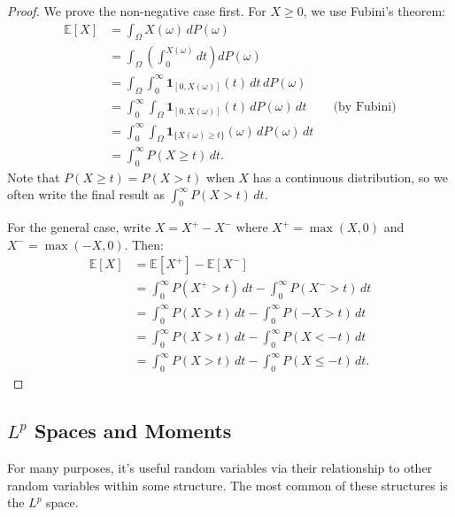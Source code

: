 \documentclass[11pt,reqno]{amsart}
\theoremstyle{definition}
\theoremstyle{remark}
\begin{document}
\begin{proof}
	We prove the non-negative case first. For $X \geq 0$, we use Fubini's theorem:
	\begin{align*}
		\mathbb{E}[X] & = \int_\Omega X(\omega) \, dP(\omega)                                                                             \\
		              & = \int_\Omega \left( \int_0^{X(\omega)} dt \right) dP(\omega)                                                     \\
		              & = \int_\Omega \int_0^\infty \mathbf{1}_{[0, X(\omega)]}(t) \, dt \, dP(\omega)                                    \\
		              & = \int_0^\infty \int_\Omega \mathbf{1}_{[0, X(\omega)]}(t) \, dP(\omega) \, dt            &  & \text{(by Fubini)} \\
		              & = \int_0^\infty \int_\Omega \mathbf{1}_{\{X(\omega) \geq t\}}(\omega) \, dP(\omega) \, dt                         \\
		              & = \int_0^\infty P(X \geq t) \, dt.
	\end{align*}
	Note that $P(X \geq t) = P(X > t)$ when $X$ has a continuous distribution, so we often write the final result as $\int_0^\infty P(X > t) \, dt$.

	For the general case, write $X = X^+ - X^-$ where $X^+ = \max(X, 0)$ and $X^- = \max(-X, 0)$. Then:
	\begin{align*}
		\mathbb{E}[X] & = \mathbb{E}[X^+] - \mathbb{E}[X^-]                                \\
		              & = \int_0^\infty P(X^+ > t) \, dt - \int_0^\infty P(X^- > t) \, dt  \\
		              & = \int_0^\infty P(X > t) \, dt - \int_0^\infty P(-X > t) \, dt     \\
		              & = \int_0^\infty P(X > t) \, dt - \int_0^\infty P(X < -t) \, dt     \\
		              & = \int_0^\infty P(X > t) \, dt - \int_0^\infty P(X \leq -t) \, dt.
	\end{align*}
\end{proof}


\subsection{\(L^p\) Spaces and Moments}

For many purposes, it's useful random variables via their relationship to other random variables within some structure. The most common of these structures is the \(L^p\) space.
\end{document}
